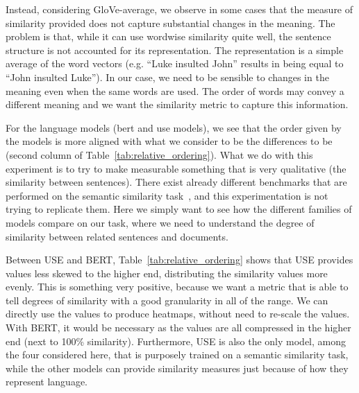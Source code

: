 Instead, considering GloVe-average, we observe in some cases that the measure of similarity provided does not capture substantial changes in the meaning. The problem is that, while it can use wordwise similarity quite well, the sentence structure is not accounted for its representation. The representation is a simple average of the word vectors (e.g. ``Luke insulted John'' results in being equal to ``John insulted Luke''). %
In our case, we need to be sensible to changes in the meaning even when the same words are used. The order of words may convey a different meaning and we want the similarity metric to capture this information.

For the language models (\acrshort{bert} and \acrshort{use} models), we see that the order given by the models is more aligned with what we consider to be the differences to be (second column of Table~\ref{tab:relative_ordering}).
What we do with this experiment is to try to make measurable something that is very qualitative (the similarity between sentences).
There exist already different benchmarks that are performed on the semantic similarity task~\citep{conneau-kiela-2018-senteval,chandrasekaran2021evolution}, and this experimentation is not trying to replicate them. Here we simply want to see how the different families of models compare on our task, where we need to understand the degree of similarity between related sentences and documents.

Between USE and BERT, Table~\ref{tab:relative_ordering} shows that USE provides values less skewed to the higher end, distributing the similarity values more evenly. 
This is something very positive, because we want a metric that is able to tell degrees of similarity with a good granularity in all of the range.
We can directly use the values to produce heatmaps, without need to re-scale the values. With BERT, it would be necessary as the values are all compressed in the higher end (next to 100\% similarity).
Furthermore, USE is also the only model, among the four considered here, that is purposely trained on a semantic similarity task, while the other models can provide similarity measures just because of how they represent language.


